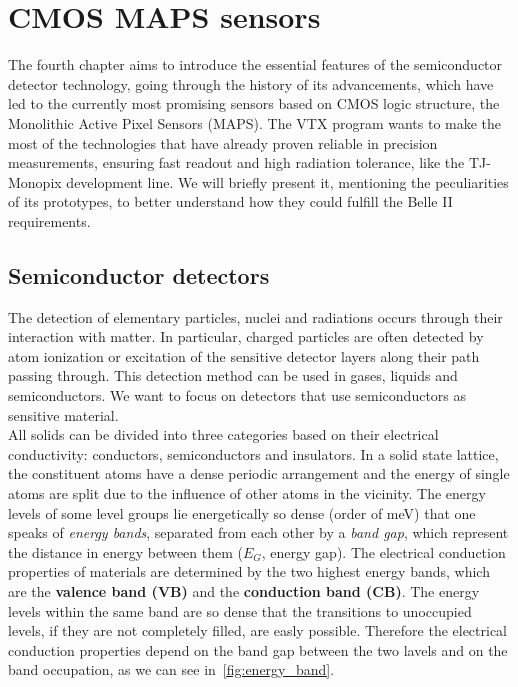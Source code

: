 \chapter{CMOS MAPS sensors} \label{ch:CMOS}

The fourth chapter aims to introduce the essential features of the semiconductor detector technology, going through the history of its advancements, which have led to the currently most promising sensors based on CMOS logic structure, the Monolithic Active Pixel Sensors (MAPS). The VTX program wants to make the most of the technologies that have already proven reliable in precision measurements, ensuring fast readout and high radiation tolerance, like the TJ-Monopix development line. We will briefly present it, mentioning the peculiarities of its prototypes, to better understand how they could fulfill the Belle II requirements.


\section{Semiconductor detectors} 

The detection of elementary particles, nuclei and radiations occurs through their interaction with matter. In particular, charged particles are often detected by atom ionization or excitation of the sensitive detector layers along their path passing through. This detection method can be used in gases, liquids and semiconductors. We want to focus on detectors that use semiconductors as sensitive material. \\

All solids can be divided into three categories based on their electrical conductivity: conductors, semiconductors and insulators. 
In a solid state lattice, the constituent atoms have a dense periodic arrangement and the energy of single atoms are split due to the influence of other atoms in the vicinity. The energy levels of some level groups lie energetically so dense (order of meV) that one speaks of \emph{energy bands}, separated from each other by a \emph{band gap}, which represent the distance in energy between them (\textbf{$E_{G}$}, energy gap). The electrical conduction properties of materials are determined by the two highest energy bands, which are the \textbf{valence band (VB)} and the \textbf{conduction band (CB)}. The energy levels within the same band are so dense that the transitions to unoccupied levels, if they are not completely filled, are easly possible. Therefore the electrical conduction properties depend on the band gap between the two lavels and on the band occupation, as we can see in~\autoref{fig:energy_band}.

